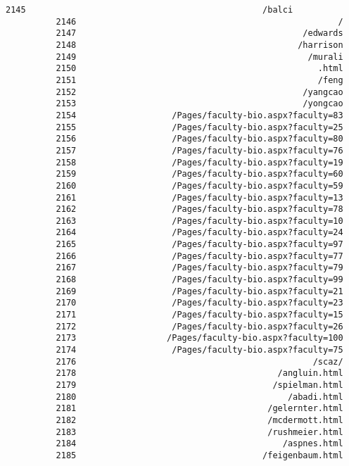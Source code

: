 \documentclass[11pt]{article}
\begin{document}
\begin{Verbatim}[commandchars=\\\{\}]
          2145                                               /balci
          2146                                                    /
          2147                                             /edwards
          2148                                            /harrison
          2149                                              /murali
          2150                                                .html
          2151                                                /feng
          2152                                             /yangcao
          2153                                             /yongcao
          2154                   /Pages/faculty-bio.aspx?faculty=83
          2155                   /Pages/faculty-bio.aspx?faculty=25
          2156                   /Pages/faculty-bio.aspx?faculty=80
          2157                   /Pages/faculty-bio.aspx?faculty=76
          2158                   /Pages/faculty-bio.aspx?faculty=19
          2159                   /Pages/faculty-bio.aspx?faculty=60
          2160                   /Pages/faculty-bio.aspx?faculty=59
          2161                   /Pages/faculty-bio.aspx?faculty=13
          2162                   /Pages/faculty-bio.aspx?faculty=78
          2163                   /Pages/faculty-bio.aspx?faculty=10
          2164                   /Pages/faculty-bio.aspx?faculty=24
          2165                   /Pages/faculty-bio.aspx?faculty=97
          2166                   /Pages/faculty-bio.aspx?faculty=77
          2167                   /Pages/faculty-bio.aspx?faculty=79
          2168                   /Pages/faculty-bio.aspx?faculty=99
          2169                   /Pages/faculty-bio.aspx?faculty=21
          2170                   /Pages/faculty-bio.aspx?faculty=23
          2171                   /Pages/faculty-bio.aspx?faculty=15
          2172                   /Pages/faculty-bio.aspx?faculty=26
          2173                  /Pages/faculty-bio.aspx?faculty=100
          2174                   /Pages/faculty-bio.aspx?faculty=75
          2176                                               /scaz/
          2178                                        /angluin.html
          2179                                       /spielman.html
          2180                                          /abadi.html
          2181                                      /gelernter.html
          2182                                      /mcdermott.html
          2183                                      /rushmeier.html
          2184                                         /aspnes.html
          2185                                     /feigenbaum.html

\end{Verbatim}
\end{document}
